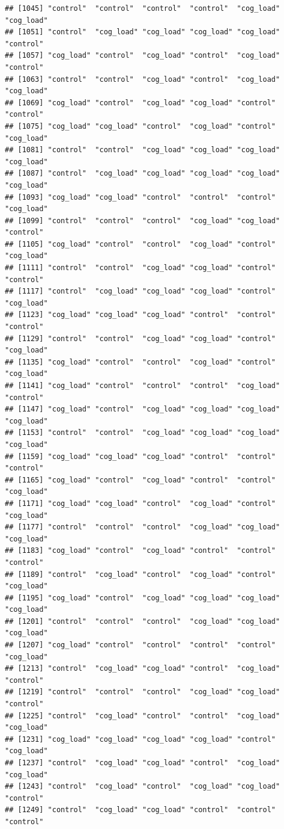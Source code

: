 \documentclass[
  american,
  man,floatsintext]{apa7}
\begin{document}
\begin{verbatim}
## [1045] "control"  "control"  "control"  "control"  "cog_load" "cog_load"
## [1051] "control"  "cog_load" "cog_load" "cog_load" "cog_load" "control" 
## [1057] "cog_load" "control"  "cog_load" "control"  "cog_load" "control" 
## [1063] "control"  "control"  "cog_load" "control"  "cog_load" "cog_load"
## [1069] "cog_load" "control"  "cog_load" "cog_load" "control"  "control" 
## [1075] "cog_load" "cog_load" "control"  "cog_load" "control"  "cog_load"
## [1081] "control"  "control"  "cog_load" "cog_load" "cog_load" "cog_load"
## [1087] "control"  "cog_load" "cog_load" "cog_load" "cog_load" "cog_load"
## [1093] "cog_load" "cog_load" "control"  "control"  "control"  "cog_load"
## [1099] "control"  "control"  "control"  "cog_load" "cog_load" "control" 
## [1105] "cog_load" "control"  "control"  "cog_load" "control"  "cog_load"
## [1111] "control"  "control"  "cog_load" "cog_load" "control"  "control" 
## [1117] "control"  "cog_load" "cog_load" "cog_load" "control"  "cog_load"
## [1123] "cog_load" "cog_load" "cog_load" "control"  "control"  "control" 
## [1129] "control"  "control"  "cog_load" "cog_load" "control"  "cog_load"
## [1135] "cog_load" "control"  "control"  "cog_load" "control"  "cog_load"
## [1141] "cog_load" "control"  "control"  "control"  "cog_load" "control" 
## [1147] "cog_load" "control"  "cog_load" "cog_load" "cog_load" "cog_load"
## [1153] "control"  "control"  "cog_load" "cog_load" "cog_load" "cog_load"
## [1159] "cog_load" "cog_load" "cog_load" "control"  "control"  "control" 
## [1165] "cog_load" "control"  "cog_load" "control"  "control"  "cog_load"
## [1171] "cog_load" "cog_load" "control"  "cog_load" "control"  "cog_load"
## [1177] "control"  "control"  "control"  "cog_load" "cog_load" "cog_load"
## [1183] "cog_load" "control"  "cog_load" "control"  "control"  "control" 
## [1189] "control"  "cog_load" "control"  "cog_load" "control"  "cog_load"
## [1195] "cog_load" "control"  "cog_load" "cog_load" "cog_load" "cog_load"
## [1201] "control"  "control"  "control"  "cog_load" "cog_load" "cog_load"
## [1207] "cog_load" "control"  "control"  "control"  "control"  "cog_load"
## [1213] "control"  "cog_load" "cog_load" "control"  "cog_load" "control" 
## [1219] "control"  "control"  "control"  "cog_load" "cog_load" "control" 
## [1225] "control"  "cog_load" "control"  "control"  "cog_load" "cog_load"
## [1231] "cog_load" "cog_load" "cog_load" "cog_load" "control"  "cog_load"
## [1237] "control"  "cog_load" "cog_load" "control"  "cog_load" "cog_load"
## [1243] "control"  "cog_load" "control"  "cog_load" "cog_load" "control" 
## [1249] "control"  "cog_load" "cog_load" "control"  "control"  "control" 

\end{verbatim}
\end{document}
